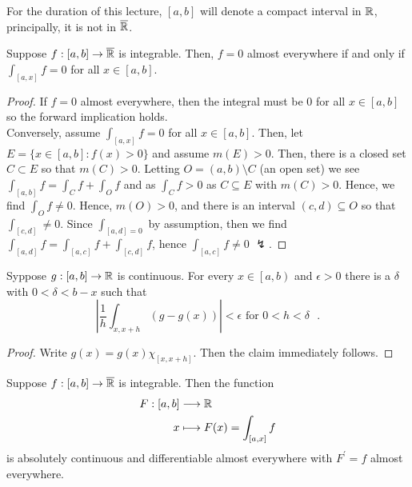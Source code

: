 For the duration of this lecture, \(\left[ a, b \right] \) will denote a compact interval in \(\mathbb{R}\), principally, it is not in \(\overline{\mathbb{R}}\).
\begin{lemma}
	Suppose \(f: \left[ a, b \right]  \to \overline{\mathbb{R}}\) is integrable. Then, \(f = 0\) almost everywhere if and only if \(\int_{\left[ a, x \right] } f = 0\) for all \(x \in \left[ a, b \right] \).
\end{lemma}
\begin{proof}
	If \(f = 0\) almost everywhere, then the integral must be \(0\) for all \(x \in \left[ a, b \right] \) so the forward implication holds.\\
	Conversely, assume \(\int _{\left[ a, x \right] } f = 0\) for all \(x \in \left[ a,b \right] \). Then, let \(E = \{x \in \left[ a, b \right] : f\left( x \right)  > 0 \} \) and assume \(m\left( E \right) > 0\). Then, there is a closed set \(C \subset E\) so that \(m\left( C \right) > 0\). Letting \(O = \left( a, b \right) \setminus C\)  (an open set) we see \(\int _{\left[ a, b \right] } f = \int_{C} f + \int _{O} f\) and as \(\int_{C}f > 0\) as \(C \subseteq E\) with \(m\left( C \right) > 0\). Hence, we find \(\int _{O} f \neq 0\). Hence, \(m\left( O \right)  > 0\), and there is an interval \(\left( c, d \right) \subseteq O\) so that \(\int_{\left[ c, d \right] } \neq 0\). Since \(\int_{\left[ a, d \right] = 0}\) by assumption, then we find \(\int_{\left[ a, d \right] }f = \int_{\left[ a, c \right] } f + \int_{\left[ c, d \right] } f\), hence \(\int_{\left[ a, c \right] }f \neq 0\) \(\lightning\).
\end{proof}
\begin{proposition}
	Syppose \(g: \left[ a , b \right]  \to \mathbb{R}\) is continuous. For every \(x \in \left[ a, b \right) \) and \(\epsilon > 0\) there is a \(\delta\) with \(0 < \delta < b-x\) such that \[
		\left| \frac{1}{h} \int_{x, x+h} (g - g\left( x \right))  \right|  < \epsilon \text{ for \(0 < h < \delta\) }
	.\]

\end{proposition}
\begin{proof}
	Write \(g\left( x \right)  = g\left( x \right) \chi_{\left[ x, x + h \right] }\). Then the claim immediately follows.
\end{proof}
\begin{theorem}
Suppose \(f: \left[ a, b \right]  \to \overline{\mathbb{R}}\) is integrable. Then the function \begin{align*}
	F: \left[ a, b \right]  &\longrightarrow \mathbb{R} \\
	x &\longmapsto F(x) = \int_{\left[ a, x \right] }f
\end{align*} is absolutely continuous and differentiable almost everywhere with \(F^{\prime} = f\) almost everywhere.
\end{theorem}
